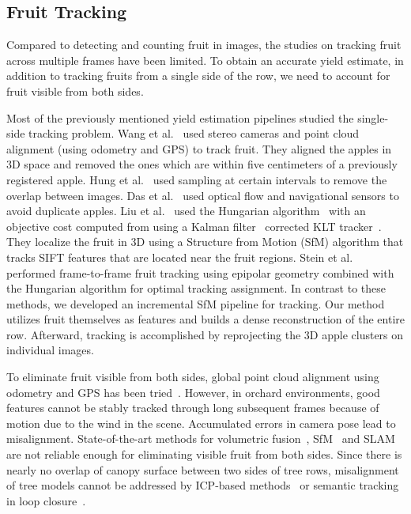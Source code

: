 \subsection{Fruit Tracking} Compared to detecting and counting fruit in images, the studies on tracking fruit across multiple frames have been limited. To obtain an accurate yield estimate, in addition to tracking fruits from a single side of the row, we need to account for fruit visible from both sides.

Most of the previously mentioned yield estimation pipelines studied the single-side tracking problem. Wang et al.~\cite{wang} used stereo cameras and point cloud alignment (using odometry and GPS) to track fruit. They aligned the apples in 3D space and removed the ones which are within five centimeters of a previously registered apple. Hung et al.~\cite{hung2015feature} used sampling at certain intervals to remove the overlap between images. Das et al.~\cite{das2015devices} used optical flow and navigational sensors to avoid duplicate apples. Liu et al.~\cite{liu_robust_2018} used the Hungarian algorithm~\cite{kuhn1955hungarian} with an objective cost computed from using a Kalman filter~\cite{kalman} corrected KLT tracker~\cite{klt}. They localize the fruit in 3D using a Structure from Motion (SfM) algorithm that tracks SIFT features that are located near the fruit regions. Stein et al.~\cite{stein_image_2016} performed frame-to-frame fruit tracking using epipolar geometry combined with the Hungarian algorithm for optimal tracking assignment. In contrast to these methods, we developed an incremental SfM pipeline for tracking. Our method utilizes fruit themselves as features and builds a dense reconstruction of the entire row. Afterward, tracking is accomplished by reprojecting the 3D apple clusters on individual images. 


 To eliminate fruit visible from both sides, global point cloud alignment using odometry and GPS has been tried~\cite{wang}. However, in orchard environments, good features cannot be stably tracked through long subsequent frames because of motion due to the wind in the scene. Accumulated errors in camera pose lead to misalignment. State-of-the-art methods for volumetric fusion~\cite{newcombe2011kinectfusion}, SfM~\cite{wu2013towards} and SLAM~\cite{mur2017orb} are not reliable enough for eliminating visible fruit from both sides. Since there is nearly no overlap of canopy surface between two sides of tree rows, misalignment of tree models cannot be addressed by ICP-based methods~\cite{medeiros2017modeling} or semantic tracking in loop closure~\cite{bowman2017probabilistic}.
 
